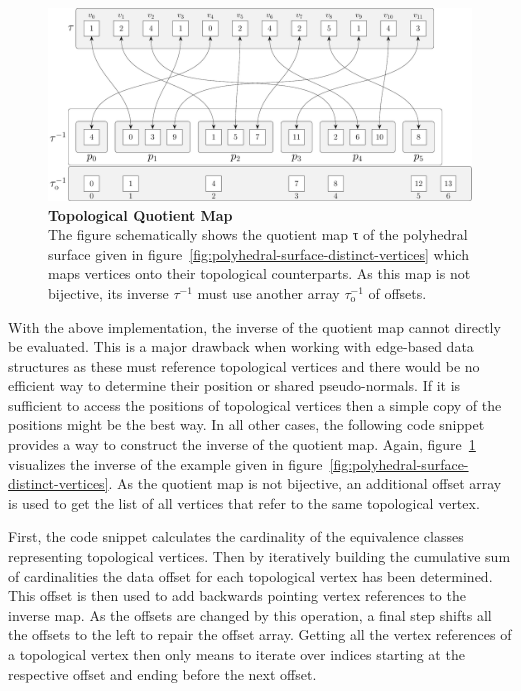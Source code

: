 \documentclass{stdlocal}
\begin{document}
  \begin{figure}
    \centering
    \includegraphics[width=\linewidth]{figures/polyhedral-surface-topological-vertex-map.pdf}
    \caption[Topological Quotient Map]{%
      \textbf{Topological Quotient Map}\\
      The figure schematically shows the quotient map τ of the polyhedral surface given in figure~\ref{fig:polyhedral-surface-distinct-vertices} which maps vertices onto their topological counterparts.
      As this map is not bijective, its inverse $τ^{-1}$ must use another array $τ^{-1}_\mathrm{o}$ of offsets.
    }
    \label{fig:polyhedral-surface-topological-vertex-map}
  \end{figure}


  \noindent
  With the above implementation, the inverse of the quotient map cannot directly be evaluated.
  This is a major drawback when working with edge-based data structures as these must reference topological vertices and there would be no efficient way to determine their position or shared pseudo-normals.
  If it is sufficient to access the positions of topological vertices then a simple copy of the positions might be the best way.
  In all other cases, the following code snippet provides a way to construct the inverse of the quotient map.
  Again, figure~\ref{fig:polyhedral-surface-topological-vertex-map} visualizes the inverse of the example given in figure~\ref{fig:polyhedral-surface-distinct-vertices}.
  As the quotient map is not bijective, an additional offset array is used to get the list of all vertices that refer to the same topological vertex.

  First, the code snippet calculates the cardinality of the equivalence classes representing topological vertices.
  Then by iteratively building the cumulative sum of cardinalities the data offset for each topological vertex has been determined.
  This offset is then used to add backwards pointing vertex references to the inverse map.
  As the offsets are changed by this operation, a final step shifts all the offsets to the left to repair the offset array.
  Getting all the vertex references of a topological vertex then only means to iterate over indices starting at the respective offset and ending before the next offset.
\end{document}

